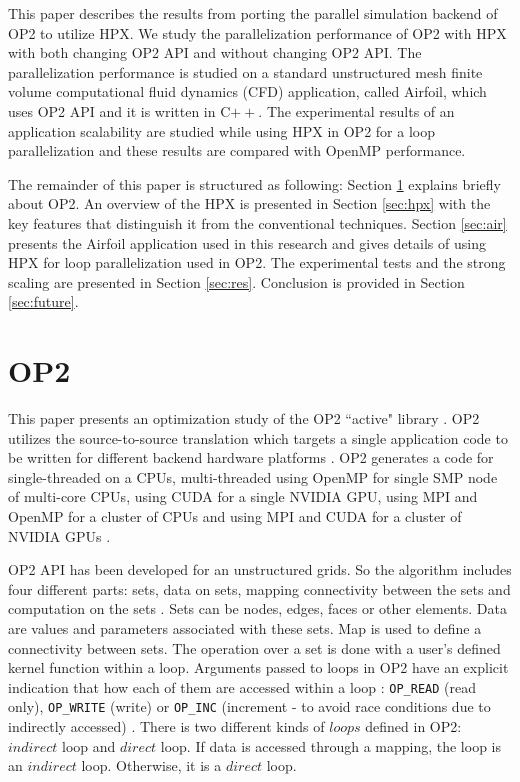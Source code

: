 \documentclass[conference]{IEEEtran}
\begin{document}
This paper describes the results from porting the parallel simulation backend of OP2 to utilize HPX. We study the parallelization performance of OP2 with HPX with both changing OP2 API and without changing OP2 API. The parallelization performance is studied on a standard unstructured mesh finite volume computational fluid dynamics (CFD) application, called Airfoil, which uses OP2 API and it is written in C$++$. The experimental results of an application scalability are studied while using HPX in OP2 for a loop parallelization and these results are compared with OpenMP performance.

The remainder of this paper is structured as following: Section \ref{sec:op2} explains briefly about OP2. An overview of the HPX is presented in Section \ref{sec:hpx} with the key features that distinguish it from the conventional techniques. Section \ref{sec:air} presents the Airfoil application used in this research and gives details of using HPX for loop parallelization used in OP2. The experimental tests and the strong scaling are presented in Section \ref{sec:res}. Conclusion is provided in Section \ref{sec:future}.

\section{OP2}
\label{sec:op2}

This paper presents an optimization study of the OP2 ``active" library \cite{o1}. OP2 utilizes the source-to-source translation which targets a single application code to be written for different backend hardware platforms \cite{o2,o3,o4}. OP2 generates a code for single-threaded on a CPUs, multi-threaded using OpenMP for single SMP node of multi-core CPUs, using CUDA for a single NVIDIA GPU, using MPI and OpenMP for a cluster of CPUs and using MPI and CUDA for a cluster of NVIDIA GPUs \cite{o4}. 

OP2 API has been developed for an unstructured grids. So the algorithm includes four different parts: sets, data on sets, mapping connectivity between the sets and computation on the sets \cite{o2,o7}. Sets can be nodes, edges, faces or other elements. Data are values and parameters associated with these sets. Map is used to define a connectivity between sets. The operation over a set is done with a user's defined kernel function within a loop. Arguments passed to loops in OP2 have an explicit indication that how each of them are accessed within a loop : \texttt{OP\_READ} (read only), \texttt{OP\_WRITE} (write) or \texttt{OP\_INC} (increment - to avoid race conditions due to indirectly accessed) \cite{o1}. There is two different kinds of $loops$ defined in OP2: $indirect$ loop and $direct$ loop. If data is accessed through a mapping, the loop is an $indirect$ loop. Otherwise, it is a $direct$ loop. 
\end{document}
